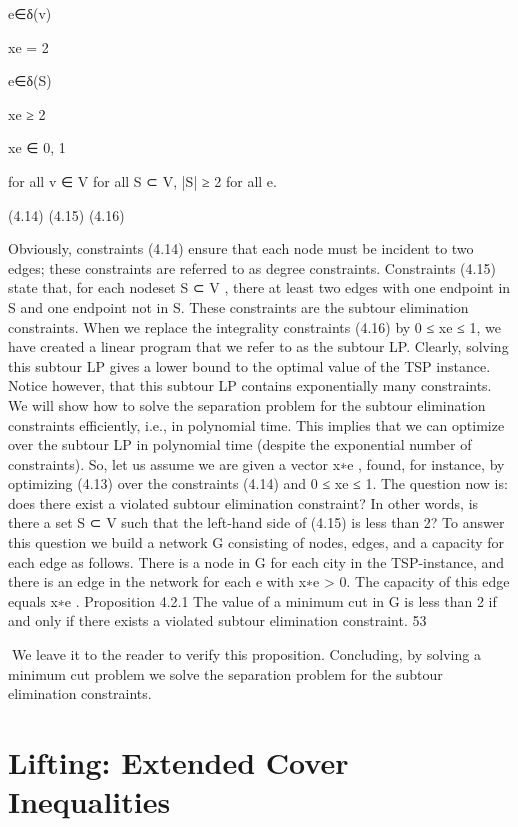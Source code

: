 e∈δ(v)

xe = 2

e∈δ(S)

xe ≥ 2

xe ∈ {0, 1}

for all v ∈ V
for all S ⊂ V, |S| ≥ 2
for all e.

(4.14)
(4.15)
(4.16)

Obviously, constraints (4.14) ensure that each node must be incident to two edges; these constraints are
referred to as degree constraints. Constraints (4.15) state that, for each nodeset S ⊂ V , there at least two
edges with one endpoint in S and one endpoint not in S. These constraints are the subtour elimination
constraints.
When we replace the integrality constraints (4.16) by 0 ≤ xe ≤ 1, we have created a linear program that
we refer to as the subtour LP. Clearly, solving this subtour LP gives a lower bound to the optimal value
of the TSP instance. Notice however, that this subtour LP contains exponentially many constraints. We
will show how to solve the separation problem for the subtour elimination constraints efficiently, i.e., in
polynomial time. This implies that we can optimize over the subtour LP in polynomial time (despite the
exponential number of constraints).
So, let us assume we are given a vector x∗e , found, for instance, by optimizing (4.13) over the constraints
(4.14) and 0 ≤ xe ≤ 1. The question now is: does there exist a violated subtour elimination constraint?
In other words, is there a set S ⊂ V such that the left-hand side of (4.15) is less than 2? To answer this
question we build a network G consisting of nodes, edges, and a capacity for each edge as follows. There
is a node in G for each city in the TSP-instance, and there is an edge in the network for each e with
x∗e > 0. The capacity of this edge equals x∗e .
Proposition 4.2.1 The value of a minimum cut in G is less than 2 if and only if there exists a violated
subtour elimination constraint.
53

We leave it to the reader to verify this proposition. Concluding, by solving a minimum cut problem we
solve the separation problem for the subtour elimination constraints.

\section{Lifting: Extended Cover Inequalities}

